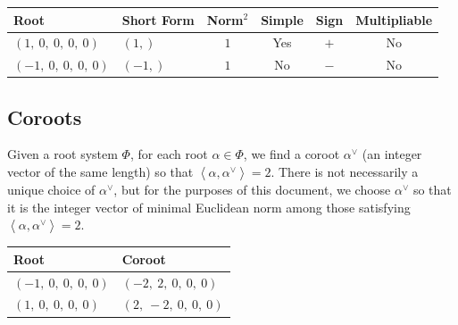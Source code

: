 \documentclass[11pt]{article}
\newcommand{\noi}{\noindent}
\newcommand{\la}{\left\langle}
\newcommand{\ra}{\right\rangle}
\theoremstyle{definition}
\newtheorem{definition}{Definition}[section]
\newif\ifsummablepairs
\begin{document}
\noi \begin{tabular}{|l|l|c|c|c|c|}
    \hline
    \textbf{Root} & \textbf{Short Form} & \textbf{Norm$^2$} & \textbf{Simple} & \textbf{Sign} & \textbf{Multipliable} \\
    \hline
    $\left( 1, \  0, \  0, \  0, \  0\right)$ & $\left( 1,\right)$ & $1$ & Yes & $+$ & No \\
    \hline
    $\left( -1, \  0, \  0, \  0, \  0\right)$ & $\left( -1,\right)$ & $1$ & No & $-$ & No \\
    \hline
\end{tabular}


\subsection{Coroots}

Given a root system $\Phi$, for each root $\alpha \in \Phi$, we find a coroot $\alpha^\vee$ (an integer vector of the same length) so that $\la \alpha, \alpha^\vee \ra = 2$. There is not necessarily a unique choice of $\alpha^\vee$, but for the purposes of this document, we choose $\alpha^\vee$ so that it is the integer vector of minimal Euclidean norm among those satisfying $\la \alpha, \alpha^\vee \ra = 2$.

\bigskip

\noindent \begin{tabular}{|l|l|}
    \hline
    \textbf{Root} & \textbf{Coroot} \\
    \hline
    $\left( -1, \  0, \  0, \  0, \  0\right)$ & $\left( -2, \  2, \  0, \  0, \  0\right)$ \\
    \hline
    $\left( 1, \  0, \  0, \  0, \  0\right)$ & $\left( 2, \  -2, \  0, \  0, \  0\right)$ \\
    \hline
\end{tabular}


\ifsummablepairs
\subsection{Linear combinations of roots}

\begin{definition}
For two roots $\alpha, \beta$ in a root system $\Phi$, the set of positive integral linear combinations of $\alpha, \beta$ that are also roots is denoted
\(
	(\alpha, \beta) = \{ i \alpha + j \beta \in \Phi : i, j \in \mathbb{Z}_{\ge 1} \}
\).
\end{definition}
\noi 
\fi
\end{document}
